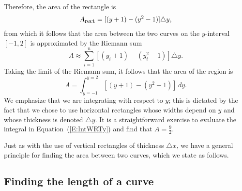 Therefore, the area of the rectangle is
$$A_{\mbox{\small{rect}}} = [(y+1) - (y^2-1)] \triangle y,$$
from which it follows that the area between the two curves on the $y$-interval $[-1,2]$ is approximated by the Riemann sum
$$A \approx \sum_{i=1}^{n} [(y_i+1)-(y_i^2-1)] \triangle y.$$
Taking the limit of the Riemann sum, it follows that the area of the region is
\begin{equation} \label{E:IntWRTy}
A = \int_{y=-1}^{y=2} [(y+1) - (y^2-1)] \, dy.
\end{equation}
We emphasize that we are integrating with respect to $y$; this is dictated by the fact that we chose to use horizontal rectangles whose widths depend on $y$ and whose thickness is denoted $\triangle y$.  It is a straightforward exercise to evaluate the integral in Equation~(\ref{E:IntWRTy}) and find that $A = \frac{9}{2}$.

Just as with the use of vertical rectangles of thickness $\triangle x$, we have a general principle for finding the area between two curves, which we state as follows.

\vspace*{5pt}
\nin {}
\vspace*{1pt}



\subsection*{Finding the length of a curve} 

